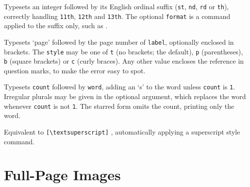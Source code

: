 		{
			Typesets an integer followed by its English ordinal suffix (\texttt{st}, \texttt{nd}, \texttt{rd} or \texttt{th}), correctly handling \texttt{11th}, \texttt{12th} and \texttt{13th}. The optional \texttt{format} is a command applied to the suffix only, such as .

		}
		{
			Typesets `page' followed by the page number of \texttt{label}, optionally enclosed in brackets. The \texttt{style} may be one of \texttt{t} (no brackets; the default), \texttt{p} (parentheses), \texttt{b} (square brackets) or \texttt{c} (curly braces). Any other value encloses the reference in question marks, to make the error easy to spot.

		}
		{
			Typesets \texttt{count} followed by \texttt{word}, adding an `s' to the word unless \texttt{count} is \texttt{1}. Irregular plurals may be given in the optional argument, which replaces the word whenever \texttt{count} is not \texttt{1}. The starred form omits the count, printing only the word.

		}
		{
			Equivalent to \texttt{[\textbackslash{}textsuperscript]} , automatically applying a superscript style command.

		}

	\section{Full-Page Images}\label{S:Images}

